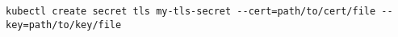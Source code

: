 \begin{verbatim}
kubectl create secret tls my-tls-secret --cert=path/to/cert/file --key=path/to/key/file
\end{verbatim}